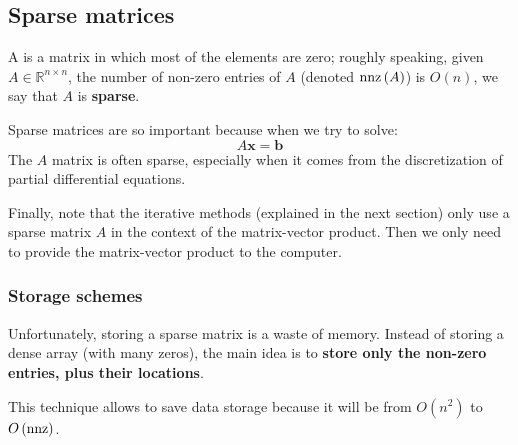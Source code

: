 \subsection{Sparse matrices}

A  is a matrix in which most of the elements are zero; roughly speaking, given $A \in \mathbb{R}^{n \times n}$, the number of non-zero entries of $A$ (denoted $\mathrm{nnz}\left(A\right)$) is $O\left(n\right)$, we say that $A$ is \textbf{sparse}.

\highspace
Sparse matrices are so important because when we try to solve:
\begin{equation*}
	A \mathbf{x} = \mathbf{b}
\end{equation*}
The $A$ matrix is often sparse, especially when it comes from the discretization of partial differential equations.

\highspace
Finally, note that the iterative methods (explained in the next section) only use a sparse matrix $A$ in the context of the matrix-vector product. Then we only need to provide the matrix-vector product to the computer.

\longline

\subsubsection{Storage schemes}

Unfortunately, storing a sparse matrix is a waste of memory. Instead of storing a dense array (with many zeros), the main idea is to \textbf{store only the non-zero entries, plus their locations}.

\highspace
This technique allows to save data storage because it will be from $O\left(n^{2}\right)$ to $O\left(\mathrm{nnz}\right)$.

